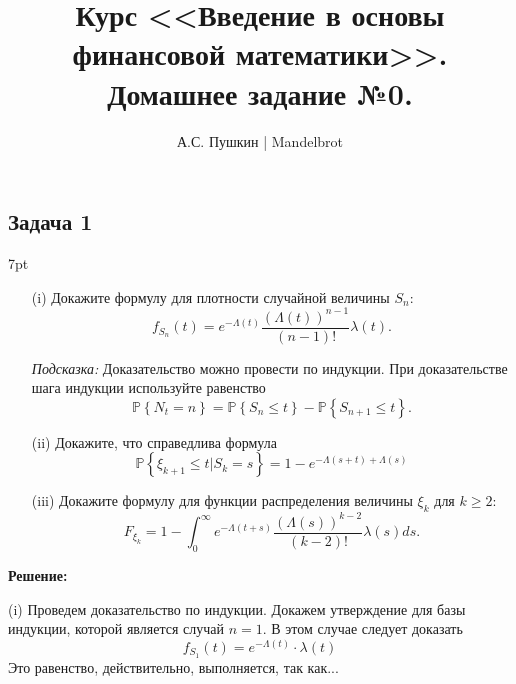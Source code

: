 \documentclass[a4paper,12pt]{article}
\title{Курс <<Введение в основы финансовой математики>>.\\Домашнее задание №0.}
\date{}
\author{А.С. Пушкин | Mandelbrot}
\newenvironment{formal}{%
	\def\FrameCommand{%
		\hspace{1pt}%
		{\color{black}\vrule width 1.5pt}%
		{\color{white}\vrule width 4pt}%
		\colorbox{white}%
	}%
	\MakeFramed{\advance\hsize-\width\FrameRestore}%
	\noindent\hspace{-4.55pt}%
	\begin{adjustwidth}{}{7pt}%
		\vspace{2pt}\vspace{2pt}%
	}
	{%
		\vspace{2pt}\end{adjustwidth}\endMakeFramed%
}
\begin{document}
\maketitle
\subsection*{Задача 1}
\begin{formal}
\begin{itemize}
	\item[(i)] Докажите формулу для плотности случайной величины $S_n$:
	$$
	f_{S_n}(t) = e^{-\Lambda(t)}\dfrac{(\Lambda(t))^{n-1}}{(n-1)!}\lambda(t).
	$$
	
	\textit{Подсказка:} Доказательство можно провести по индукции. При доказательстве шага индукции используйте равенство
	$$
	\mathbb{P}\left\{N_t = n\right\} = \mathbb{P}\left\{S_n \leq t\right\} - \mathbb{P}\left\{S_{n+1}\leq t \right\}.
	$$
	\item[(ii)] Докажите, что справедлива формула
	$$
	\mathbb{P}\left\{\xi_{k+1}\leq t | S_k = s \right\} = 1 - e^{-\Lambda(s+t) + \Lambda(s)}
	$$
	\item[(iii)] Докажите формулу для функции распределения величины $\xi_k$ для $k\geq 2$:
	$$
	F_{\xi_k} = 1 - \int_{0}^{\infty} e^{-\Lambda(t+s)}\dfrac{(\Lambda(s))^{k-2}}{(k-2)!}\lambda(s)ds.
	$$
\end{itemize}
\end{formal}
\textbf{\large Решение:}

(i) Проведем доказательство по индукции. Докажем утверждение для базы индукции, которой является случай $n = 1$. В этом случае следует доказать
$$
f_{S_1}(t) = e^{-\Lambda(t)}\cdot \lambda(t)
$$
Это равенство, действительно, выполняется, так как...
\end{document}
